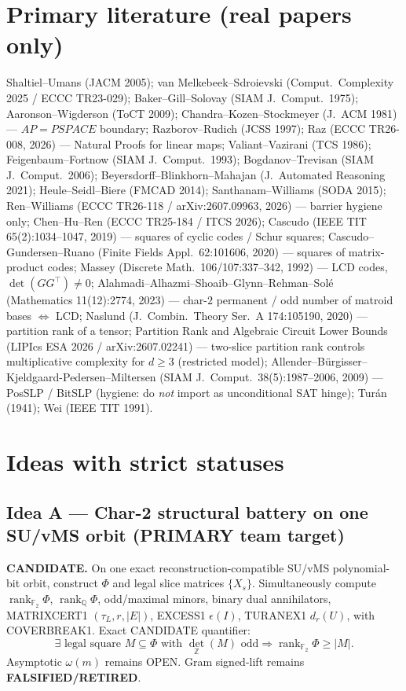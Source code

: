 \documentclass[11pt]{article}
\begin{document}
\section*{Primary literature (real papers only)}
Shaltiel--Umans (JACM 2005); van Melkebeek--Sdroievski (Comput.\ Complexity 2025 / ECCC TR23-029);
Baker--Gill--Solovay (SIAM J.\ Comput.\ 1975); Aaronson--Wigderson (ToCT 2009);
Chandra--Kozen--Stockmeyer (J.\ ACM 1981) --- $AP=PSPACE$ boundary;
Razborov--Rudich (JCSS 1997); Raz (ECCC TR26-008, 2026) --- Natural Proofs for linear maps;
Valiant--Vazirani (TCS 1986); Feigenbaum--Fortnow (SIAM J.\ Comput.\ 1993);
Bogdanov--Trevisan (SIAM J.\ Comput.\ 2006);
Beyersdorff--Blinkhorn--Mahajan (J.\ Automated Reasoning 2021);
Heule--Seidl--Biere (FMCAD 2014); Santhanam--Williams (SODA 2015);
Ren--Williams (ECCC TR26-118 / arXiv:2607.09963, 2026) --- barrier hygiene only;
Chen--Hu--Ren (ECCC TR25-184 / ITCS 2026); Cascudo (IEEE TIT 65(2):1034--1047, 2019) ---
squares of cyclic codes / Schur squares;
Cascudo--Gundersen--Ruano (Finite Fields Appl.\ 62:101606, 2020) --- squares of matrix-product codes;
Massey (Discrete Math.\ 106/107:337--342, 1992) --- LCD codes, $\det(GG^\top)\neq 0$;
Alahmadi--Alhazmi--Shoaib--Glynn--Rehman--Sol\'e (Mathematics 11(12):2774, 2023) ---
char-$2$ permanent / odd number of matroid bases $\Leftrightarrow$ LCD;
Naslund (J.\ Combin.\ Theory Ser.\ A 174:105190, 2020) --- partition rank of a tensor;
Partition Rank and Algebraic Circuit Lower Bounds (LIPIcs ESA 2026 / arXiv:2607.02241) ---
two-slice partition rank controls multiplicative complexity for $d\ge 3$ (restricted model);
Allender--B\"urgisser--Kjeldgaard-Pedersen--Miltersen (SIAM J.\ Comput.\ 38(5):1987--2006, 2009)
--- PosSLP / BitSLP (hygiene: do \emph{not} import as unconditional SAT hinge);
Tur\'an (1941); Wei (IEEE TIT 1991).

\section*{Ideas with strict statuses}
\subsection*{Idea A --- Char-2 structural battery on one SU/vMS orbit (PRIMARY team target)}
\textbf{CANDIDATE.} On one exact reconstruction-compatible SU/vMS polynomial-bit orbit, construct
$\Phi$ and legal slice matrices $\{X_s\}$. Simultaneously compute
$\operatorname{rank}_{\mathbb F_2}\Phi$, $\operatorname{rank}_{\mathbb Q}\Phi$, odd/maximal minors,
binary dual annihilators, MATRIXCERT1 $(\tau_L,r,|E|)$, EXCESS1 $\epsilon(I)$, TURANEX1 $d_r(U)$,
with COVERBREAK1. Exact CANDIDATE quantifier:
\[
\exists\text{ legal square }M\subseteq\Phi\text{ with }\det_{\mathbb Z}(M)\text{ odd}
\Rightarrow\operatorname{rank}_{\mathbb F_2}\Phi\ge|M|.
\]
Asymptotic $\omega(m)$ remains OPEN. Gram signed-lift remains \textbf{FALSIFIED/RETIRED}.
\end{document}
